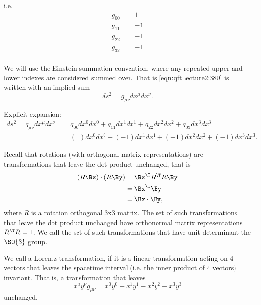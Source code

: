 i.e.
\begin{equation}\label{eqn:qftLecture2:420}
\begin{aligned}
g_{00} &= 1 \\
g_{11} &= -1 \\
g_{22} &= -1 \\
g_{33} &= -1 \\
\end{aligned}
\end{equation}

We will use the Einstein summation convention, where any repeated upper and lower indexes are considered summed over.  That is \cref{eqn:qftLecture2:380} is written with an implied sum
\begin{equation}\label{eqn:qftLecture2:440}
ds^2 = g_{\mu\nu} dx^\mu dx^\nu.
\end{equation}

Explicit expansion:
\begin{equation}\label{eqn:qftLecture2:460}
\begin{aligned}
ds^2 = g_{\mu\nu} dx^\mu dx^\nu
&=
g_{00} dx^0 dx^0
+g_{11} dx^1 dx^1
+g_{22} dx^2 dx^2
+g_{33} dx^3 dx^3 \\
&=
(1) dx^0 dx^0
+ (-1) dx^1 dx^1
+ (-1) dx^2 dx^2
+ (-1) dx^3 dx^3.
\end{aligned}
\end{equation}

Recall that rotations (with orthogonal matrix representations) are transformations that leave the dot product unchanged, that is
\begin{equation}\label{eqn:qftLecture2:480}
\begin{aligned}
(R \Bx) \cdot (R \By)
&= \Bx^\T R^\T R \By \\
&= \Bx^\T \By \\
&= \Bx \cdot \By,
\end{aligned}
\end{equation}
%
where \( R \) is a rotation orthogonal 3x3 matrix.  The set of such transformations that leave the dot product unchanged have orthonormal matrix representations \( R^\T R = 1 \).  We call the set of such transformations that have unit determinant the \(\SO{3}\) group.

We call a Lorentz transformation, if it is a linear transformation acting on 4 vectors that leaves the spacetime interval (i.e. the inner product of 4 vectors) invariant.  That is, a transformation that leaves
\begin{equation}\label{eqn:qftLecture2:500}
x^\mu y^\nu g_{\mu\nu} = x^0 y^0 - x^1 y^1 - x^2 y^2 - x^3 y^3
\end{equation}
unchanged.

